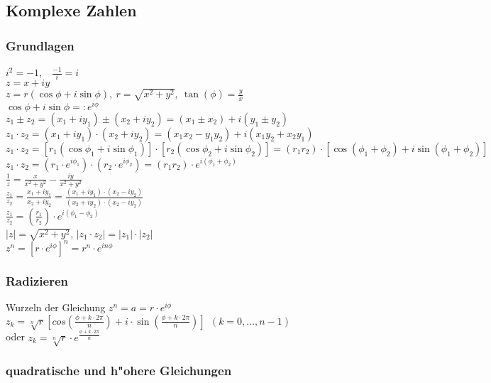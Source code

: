 \documentclass[10pt, a4paper, twocolumn]{scrartcl}
\begin{document}
\subsection{Komplexe Zahlen}

\subsubsection{Grundlagen}

$i^2=-1$,\ \ $\frac{-1}{i}=i$\\
$z=x+iy$\\
$z=r(\cos\phi+i\sin\phi),\:r=\sqrt{x^2+y^2},\:\tan(\phi)=\frac{y}{x}$\\
$\cos\phi+i\sin\phi=:e^{i\phi}$\\
$z_1\pm z_2=(x_1+iy_1)\pm(x_2+iy_2)=(x_1\pm x_2)+i(y_1\pm y_2)$\\

$z_1\cdotp z_2=(x_1+iy_1)\cdotp(x_2+iy_2)=(x_1 x_2-y_1 y_2)+i(x_1 y_2 + x_2 y_1)$\\
$z_1\cdotp z_2=[r_1(\cos\phi_1+i\sin\phi_1)]\cdotp[r_2(\cos\phi_2+i\sin\phi_2)]=(r_1 r_2)\cdotp[\cos(\phi_1 +\phi_2)+i\sin(\phi_1 + \phi_2)]$\\
$z_1 \cdotp z_2=(r_1\cdotp e^{i\phi_1})\cdotp (r_2\cdotp e^{i\phi_2})=(r_1 r_2)\cdotp e^{i(\phi_1+\phi_2)}$\\

$\frac{1}{z}=\frac{x}{x^2+y^2}-\frac{iy}{x^2+y^2}$\\
$\frac{z_1}{z_2}=\frac{x_1 + iy_1}{x_2 + iy_2}=\frac{(x_1 +iy_1)\cdotp(x_2 - iy_2)}{(x_2 + iy_2)\cdotp(x_2 - iy_2)}$\\
$\frac{z_1}{z_2}=(\frac{r_1}{r_2})\cdotp e^{i(\phi_1-\phi_2)}$\\

$|z|=\sqrt{x^2+y^2}$, $|z_1\cdotp z_2|=|z_1|\cdotp|z_2|$\\

$z^n=[r\cdotp e^{i\phi}]^n=r^n\cdotp e^{in\phi}$

\subsubsection{Radizieren}
Wurzeln der Gleichung $z^n=a=r\cdotp e^{i\phi}$\\
$z_k=\sqrt[n]{r}[cos(\frac{\phi+k\cdotp 2\pi}{n})+i\cdotp \sin(\frac{\phi + k\cdotp 2\pi}{n})]\:\:(k=0,\ldots,n-1)$\\
oder $z_k=\sqrt[n]{r}\cdotp e^{\frac{\phi+k\cdotp 2\pi}{n}}$

\subsubsection{quadratische und h"ohere Gleichungen}
\end{document}
